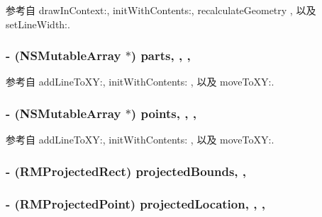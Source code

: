 参考自 draw\-In\-Context\-:, init\-With\-Contents\-:, recalculate\-Geometry , 以及 set\-Line\-Width\-:.

\hypertarget{interface_r_m_path_a1e478ab9621bef7d287b13accde96514}{
\subsubsection[{parts}]{\setlength{\rightskip}{0pt plus 5cm}-\/ (N\-S\-Mutable\-Array $\ast$) parts\hspace{0.3cm}{\ttfamily [read]}, {\ttfamily [write]}, {\ttfamily [atomic]}, {\ttfamily [retain]}}}\label{interface_r_m_path_a1e478ab9621bef7d287b13accde96514}


参考自 add\-Line\-To\-X\-Y\-:, init\-With\-Contents\-: , 以及 move\-To\-X\-Y\-:.

\hypertarget{interface_r_m_path_a376fb33189a4b9f1f6694825fc7d77d4}{
\subsubsection[{points}]{\setlength{\rightskip}{0pt plus 5cm}-\/ (N\-S\-Mutable\-Array $\ast$) points\hspace{0.3cm}{\ttfamily [read]}, {\ttfamily [write]}, {\ttfamily [atomic]}, {\ttfamily [retain]}}}\label{interface_r_m_path_a376fb33189a4b9f1f6694825fc7d77d4}


参考自 add\-Line\-To\-X\-Y\-:, init\-With\-Contents\-: , 以及 move\-To\-X\-Y\-:.

\hypertarget{interface_r_m_path_ab57ac16906ba51dfc400d02f6a6cce0d}{
\subsubsection[{projected\-Bounds}]{\setlength{\rightskip}{0pt plus 5cm}-\/ ({\bf R\-M\-Projected\-Rect}) projected\-Bounds\hspace{0.3cm}{\ttfamily [read]}, {\ttfamily [nonatomic]}, {\ttfamily [assign]}}}\label{interface_r_m_path_ab57ac16906ba51dfc400d02f6a6cce0d}
\hypertarget{interface_r_m_path_a696f7378ed70695bdbc0257105e48eda}{
\subsubsection[{projected\-Location}]{\setlength{\rightskip}{0pt plus 5cm}-\/ ({\bf R\-M\-Projected\-Point}) projected\-Location\hspace{0.3cm}{\ttfamily [read]}, {\ttfamily [write]}, {\ttfamily [nonatomic]}, {\ttfamily [assign]}}}\label{interface_r_m_path_a696f7378ed70695bdbc0257105e48eda}


